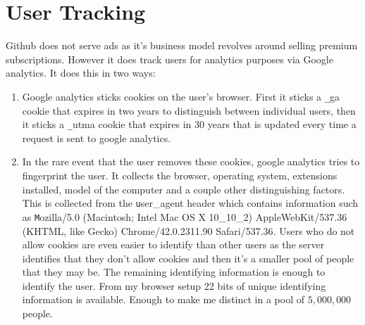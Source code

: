 \documentclass[12pt]{article}
\renewcommand{\tt}[1]{\texttt{#1}}
\begin{document}
\section{User Tracking}\label{tracking}
Github does not serve ads as it's business model revolves around selling premium subscriptions. However it does track users for analytics purposes via Google analytics. It does this in two ways:

\begin{enumerate}
\item Google analytics sticks cookies on the user's browser. First it sticks a {\tt \_ga} cookie that expires in two years to distinguish between individual users, then it sticks a {\tt \_utma} cookie that expires in 30 years that is updated every time a request is sent to google analytics. 

\item In the rare event that the user removes these cookies, google analytics tries to fingerprint the user. It collects the browser, operating system, extensions installed, model of the computer and a couple other distinguishing factors. This is collected from the {\tt user\_agent} header which contains information such as {\tt Mozilla/5.0 (Macintosh; Intel Mac OS X 10\_10\_2) AppleWebKit/537.36 (KHTML, like Gecko) Chrome/42.0.2311.90 Safari/537.36}. Users who do not allow cookies are even easier to identify than other users as the server identifies that they don't allow cookies and then it's a smaller pool of people that they may be. The remaining identifying information is enough to identify the user. From my browser setup 22 bits of unique identifying information is available. Enough to make me distinct in a pool of $5,000,000$ people.


\end{enumerate}
\end{document}
